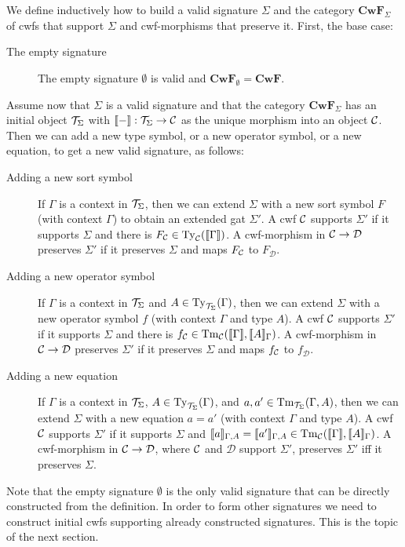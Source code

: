 \documentclass{lmcs}
\def\D{\mathcal{D}}
\def\Cwf{\mathbf{CwF}}
\begin{document}
\begin{definition}
We define inductively how to build a valid signature $\Sigma$ and the category $\Cwf_\Sigma$ of cwfs that support $\Sigma$ and cwf-morphisms that preserve it. First, the base case:
\begin{description}
\item[The empty signature] The empty signature $\emptyset$ is valid and $\Cwf_\emptyset = \Cwf$. 
\end{description}
Assume now that $\Sigma$ is a valid signature and that the category $\Cwf_\Sigma$ has an initial object ${\mathcal T}_\Sigma$ with $\llbracket - \rrbracket : {\mathcal T}_\Sigma \to {\mathcal C}$ as the unique morphism into an object ${\mathcal C}$. Then we can add a new type symbol, or a new operator symbol, or a new equation, to get a new valid signature, as follows:
\begin{description}
\item[Adding a new sort symbol] 
If $\Gamma$ is a context in ${\mathcal T}_\Sigma$, then we can extend $\Sigma$ with a new sort symbol $F$ (with context $\Gamma$) to obtain an extended gat $\Sigma'$. A cwf ${\mathcal C}$ supports $\Sigma'$ if it supports $\Sigma$ and there is $F_{\mathcal C} \in \mathrm{Ty}_{\mathcal C}(\llbracket \Gamma \rrbracket)$. A cwf-morphism in $\C \to \D$ preserves $\Sigma'$ if it preserves $\Sigma$ and maps $F_{\mathcal C}$ to $F_\D$.
\item[Adding a new operator symbol] 
If $\Gamma$ is a context in ${\mathcal T}_\Sigma$ and $A \in \mathrm{Ty}_{{\mathcal T}_\Sigma}(\Gamma)$, then we can extend $\Sigma$ with a new operator symbol $f$ (with context $\Gamma$ and type $A$). A cwf ${\mathcal C}$ supports $\Sigma'$ if it supports $\Sigma$ and there is $f_{\mathcal C} \in\mathrm{Tm}_{\mathcal C}(\llbracket \Gamma \rrbracket,\llbracket A \rrbracket_{\Gamma})$.
A cwf-morphism in $\C \to \D$ preserves $\Sigma'$ if it preserves $\Sigma$ and maps $f_{\mathcal C}$ to $f_\D$.
\item[Adding a new equation] 
If $\Gamma$ is a context in ${\mathcal T}_\Sigma$, $A \in \mathrm{Ty}_{{\mathcal T}_\Sigma}(\Gamma)$, and $a, a' \in \mathrm{Tm}_{{\mathcal T}_\Sigma}(\Gamma,A)$, then we can extend $\Sigma$ with a new equation $a = a'$ (with context $\Gamma$ and type $A$). A cwf ${\mathcal C}$ supports $\Sigma'$ if it supports $\Sigma$ and $\llbracket a \rrbracket_{\Gamma,A}= \llbracket a' \rrbracket_{\Gamma,A} \in \mathrm{Tm}_{\mathcal C}(\llbracket \Gamma \rrbracket,\llbracket A \rrbracket_\Gamma)$. A cwf-morphism in $\C \to \D$, where ${\mathcal C}$ and $\D$ support $\Sigma'$, preserves $\Sigma'$ iff it preserves $\Sigma$.
\end{description}
\end{definition}

Note that the empty signature $\emptyset$ is the only valid signature that can be directly constructed from the definition. In order to form other signatures we need to construct initial cwfs supporting already constructed signatures. This is the topic of the next section.
\end{document}
